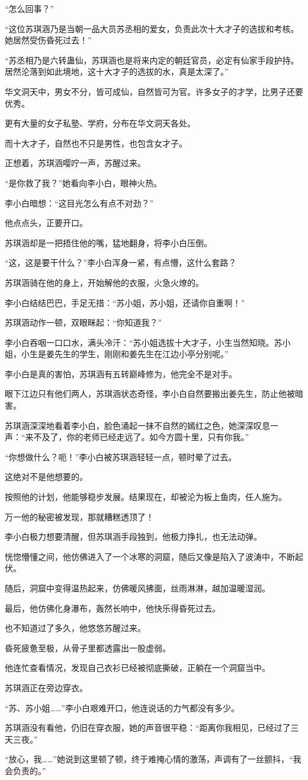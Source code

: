 \begin{this_body}
“怎么回事？”

“这位苏琪涵乃是当朝一品大员苏丞相的爱女，负责此次十大才子的选拔和考核。她居然受伤昏死过去！”

“苏丞相乃是六转蛊仙，苏琪涵也是将来内定的朝廷官员，必定有仙家手段护持。居然沦落到如此境地，这十大才子的选拔的水，真是太深了。”

华文洞天中，男女不分，皆可成仙，自然皆可为官。许多女子的才学，比男子还要优秀。

更有大量的女子私塾、学府，分布在华文洞天各处。

而十大才子，自然也不只是男性，也包含女才子。

正想着，苏琪涵嘤咛一声，苏醒过来。

“是你救了我？”她看向李小白，眼神火热。

李小白暗想：“这目光怎么有点不对劲？”

他点点头，正要开口。

苏琪涵却是一把捂住他的嘴，猛地翻身，将李小白压倒。

“这，这是要干什么？”李小白浑身一紧，有点懵，这什么套路？

苏琪涵骑在他的身上，开始解他的衣服，火急火燎的。

李小白结结巴巴，手足无措：“苏小姐，苏小姐，还请你自重啊！”

苏琪涵动作一顿，双眼眯起：“你知道我？”

李小白吞咽一口口水，满头冷汗：“苏小姐选拔十大才子，小生当然知晓。苏小姐，小生是姜先生的学生，刚刚和姜先生在江边小亭分别呢。”

李小白是真的害怕，苏琪涵有五转巅峰修为，他完全不是对手。

眼下江边只有他们两人，苏琪涵状态奇怪，李小白自然要搬出姜先生，防止他被暗害。

苏琪涵深深地看着李小白，脸色涌起一抹不自然的嫣红之色，她深深叹息一声：“来不及了，你的老师已经走远了。如今方圆十里，只有你我。”

“你想做什么？呃！”李小白被苏琪涵轻轻一点，顿时晕了过去。

这绝对不是他想要的。

按照他的计划，他能够稳步发展。结果现在，却被沦为板上鱼肉，任人施为。

万一他的秘密被发现，那就糟糕透顶了！

李小白极力想要清醒，但苏琪涵手段独到，他极力挣扎，也无法动弹。

恍惚懵懂之间，他仿佛进入了一个冰寒的洞窟，随后又像是陷入了波涛中，不断起伏。

随后，洞窟中变得温热起来，仿佛暖风拂面，丝雨淋淋，越加温暖湿润。

最后，他仿佛化身瀑布，轰然长响中，他快乐得昏死过去。

也不知道过了多久，他悠悠苏醒过来。

昏死疲惫至极，从骨子里都透露出一股虚弱。

他连忙查看情况，发现自己衣衫已经被彻底撕破，正躺在一个洞窟当中。

苏琪涵正在旁边穿衣。

“苏、苏小姐……”李小白艰难开口，他连说话的力气都没有多少。

苏琪涵没有看他，仍旧在穿衣服，她的声音很平稳：“距离你我相见，已经过了三天三夜。”

“放心，我……”她说到这里顿了顿，终于难掩心情的激荡，声调有了一丝颤抖，“我会负责的。”

\end{this_body}

